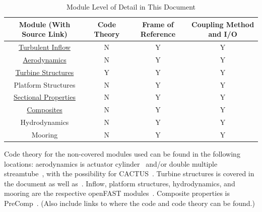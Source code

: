 \documentclass[11pt]{article}
\begin{document}
\begin{table}[htbp!]
\begin{center}
\caption{Module Level of Detail in This Document}
\begin{tabular}{|c| c c c|}
\hline
Module (With Source Link) & Code Theory & Frame of Reference & Coupling Method and I/O \\
\hline
\href{https://github.com/old-NWTC/InflowWind}{Turbulent Inflow} & N & Y & Y  \\
\href{https://gitlab.sandia.gov/8821-vawt-tools/VAWTAero.jl}{Aerodynamics} & N & Y & Y \\
\href{https://gitlab.sandia.gov/8821-vawt-tools/OWENS.jl}{Turbine Structures} & Y & Y & Y \\
Platform Structures & N & Y & Y \\
\href{https://gitlab.sandia.gov/8821-vawt-tools/PreComp.jl}{Sectional Properties}& N & Y & Y \\
\href{https://github.com/byuflowlab/Composites.jl}{Composites} & N & Y & Y \\
Hydrodynamics & N & Y & Y \\
Mooring & N & Y & Y \\
\hline

\end{tabular}
\end{center}
\end{table}

Code theory for the non-covered modules used can be found in the following locations: aerodynamics is actuator cylinder~\cite{ac} and/or double multiple streamtube~\cite{DMS}, with the possibility for CACTUS~\cite{cactus}.  Turbine structures is covered in the document as well as~\cite{owens2013theoretical}. Inflow, platform structures, hydrodynamics, and mooring are the respective openFAST modules~\cite{openFAST}.  Composite properties is PreComp~\cite{precomp}.  (Also include links to where the code and code theory can be found.)

%

\vspace{12pt}
\end{document}
